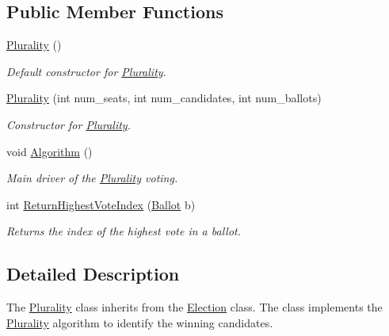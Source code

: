 \subsection*{Public Member Functions}
\begin{DoxyCompactItemize}
\item 
\hyperlink{class_plurality_a26d4ba756a5bfc0d5c8d40865e5ecbb8}{Plurality} ()\hypertarget{class_plurality_a26d4ba756a5bfc0d5c8d40865e5ecbb8}{}\label{class_plurality_a26d4ba756a5bfc0d5c8d40865e5ecbb8}

\begin{DoxyCompactList}\small\item\em Default constructor for \hyperlink{class_plurality}{Plurality}. \end{DoxyCompactList}\item 
\hyperlink{class_plurality_a4fc0116515730145cf4d4cfedbf34b1c}{Plurality} (int num\+\_\+seats, int num\+\_\+candidates, int num\+\_\+ballots)
\begin{DoxyCompactList}\small\item\em Constructor for \hyperlink{class_plurality}{Plurality}. \end{DoxyCompactList}\item 
void \hyperlink{class_plurality_a63b556aa77c6ea04f52a42fadc9474e8}{Algorithm} ()\hypertarget{class_plurality_a63b556aa77c6ea04f52a42fadc9474e8}{}\label{class_plurality_a63b556aa77c6ea04f52a42fadc9474e8}

\begin{DoxyCompactList}\small\item\em Main driver of the \hyperlink{class_plurality}{Plurality} voting. \end{DoxyCompactList}\item 
int \hyperlink{class_plurality_a9617e0aacc5e6fb714632f4657ee6576}{Return\+Highest\+Vote\+Index} (\hyperlink{class_ballot}{Ballot} b)
\begin{DoxyCompactList}\small\item\em Returns the index of the highest vote in a ballot. \end{DoxyCompactList}\end{DoxyCompactItemize}


\subsection{Detailed Description}
The \hyperlink{class_plurality}{Plurality} class inherits from the \hyperlink{class_election}{Election} class. The class implements the \hyperlink{class_plurality}{Plurality} algorithm to identify the winning candidates. 



